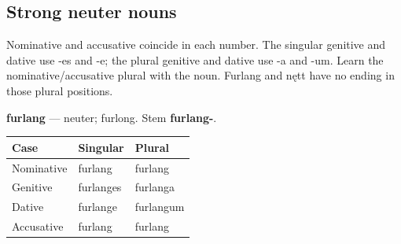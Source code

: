 \subsection*{Strong neuter nouns}

Nominative and accusative coincide in each number. The singular genitive and dative use -es and -e; the plural genitive and dative use -a and -um. Learn the nominative/\allowbreak{}accusative plural with the noun. Furlang and nętt have no ending in those plural positions.

\par\begin{minipage}{\linewidth}\raggedright
\textbf{furlang} — neuter; furlong. Stem \textbf{furlang-}.

\par\begingroup
\fontsize{10.5}{13.2}\selectfont
\setlength{\LTleft}{0pt}\setlength{\LTright}{\fill}
\noindent
\begin{tabular}{@{}>{\raggedright\arraybackslash}p{39.46mm}>{\raggedright\arraybackslash}p{39.46mm}>{\raggedright\arraybackslash}p{39.46mm}@{}}
\toprule
\textbf{Case} & \textbf{Singular} & \textbf{Plural} \\
\midrule
Nominative & furlang & furlang \\
Genitive & furlanges & furlanga \\
Dative & furlange & furlangum \\
Accusative & furlang & furlang \\
\bottomrule
\end{tabular}
\par\endgroup

\end{minipage}\par
